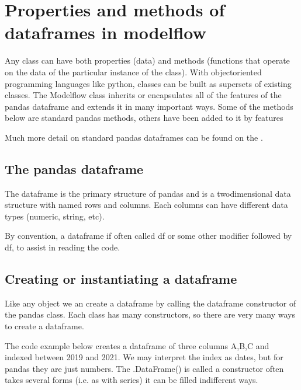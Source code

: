 \documentclass[letterpaper,10pt,english]{jupyterBook}
\begin{document}
\section{Properties and methods of dataframes in modelflow}
\label{\detokenize{content/04_PythonEssentials/PythonPackagesEtc:properties-and-methods-of-dataframes-in-modelflow}}
\sphinxAtStartPar
Any class can have both properties (data) and methods (functions that operate on the data of the particular instance of the class). With object\sphinxhyphen{}oriented programming languages like python, classes can be built as supersets of existing classes. The Modelflow class  inherits or encapsulates all of the features of the pandas dataframe and extends it in many important ways.  Some of the methods below are standard pandas methods, others have been added to it by  features

\sphinxAtStartPar
Much more detail on standard pandas dataframes can be found on the .


\subsection{The pandas dataframe}
\label{\detokenize{content/04_PythonEssentials/PythonPackagesEtc:the-pandas-dataframe}}
\sphinxAtStartPar
The dataframe is the primary structure of pandas and is a two\sphinxhyphen{}dimensional data structure with named rows and columns.  Each columns can have different data types (numeric, string, etc).

\sphinxAtStartPar
By convention, a dataframe if often called df or some other modifier followed by df, to assist in reading the code.


\subsection{Creating or instantiating a dataframe}
\label{\detokenize{content/04_PythonEssentials/PythonPackagesEtc:creating-or-instantiating-a-dataframe}}
\sphinxAtStartPar
Like any object we an create a dataframe by calling the dataframe constructor of the pandas class.  Each class has many constructors, so there are very many ways to create a dataframe.

\sphinxAtStartPar
The code example below creates a dataframe of three columns A,B,C and  indexed between 2019 and 2021.  We may interpret the index as dates, but for pandas they are just numbers.  The .DataFrame() is called a constructor often takes several forms (i.e. as with series) it can be filled indifferent ways.
\end{document}
